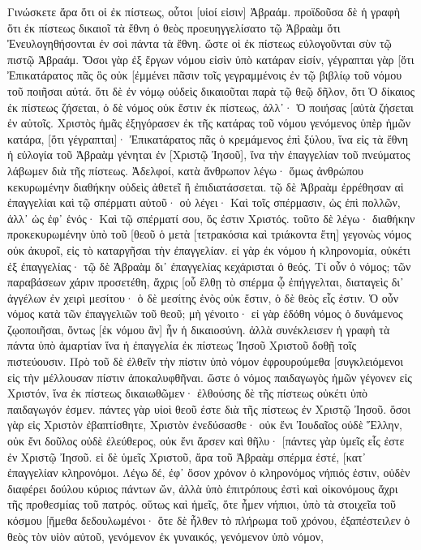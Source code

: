 Γινώσκετε ἄρα ὅτι οἱ ἐκ πίστεως, οὗτοι [υἱοί εἰσιν] Ἀβραάμ. 
προϊδοῦσα δὲ ἡ γραφὴ ὅτι ἐκ πίστεως δικαιοῖ τὰ ἔθνη ὁ θεὸς προευηγγελίσατο τῷ Ἀβραὰμ ὅτι Ἐνευλογηθήσονται ἐν σοὶ πάντα τὰ ἔθνη. 
ὥστε οἱ ἐκ πίστεως εὐλογοῦνται σὺν τῷ πιστῷ Ἀβραάμ. 
Ὅσοι γὰρ ἐξ ἔργων νόμου εἰσὶν ὑπὸ κατάραν εἰσίν, γέγραπται γὰρ [ὅτι Ἐπικατάρατος πᾶς ὃς οὐκ [ἐμμένει πᾶσιν τοῖς γεγραμμένοις ἐν τῷ βιβλίῳ τοῦ νόμου τοῦ ποιῆσαι αὐτά. 
ὅτι δὲ ἐν νόμῳ οὐδεὶς δικαιοῦται παρὰ τῷ θεῷ δῆλον, ὅτι Ὁ δίκαιος ἐκ πίστεως ζήσεται, 
ὁ δὲ νόμος οὐκ ἔστιν ἐκ πίστεως, ἀλλ᾽· Ὁ ποιήσας [αὐτὰ ζήσεται ἐν αὐτοῖς. 
Χριστὸς ἡμᾶς ἐξηγόρασεν ἐκ τῆς κατάρας τοῦ νόμου γενόμενος ὑπὲρ ἡμῶν κατάρα, [ὅτι γέγραπται]· Ἐπικατάρατος πᾶς ὁ κρεμάμενος ἐπὶ ξύλου, 
ἵνα εἰς τὰ ἔθνη ἡ εὐλογία τοῦ Ἀβραὰμ γένηται ἐν [Χριστῷ Ἰησοῦ], ἵνα τὴν ἐπαγγελίαν τοῦ πνεύματος λάβωμεν διὰ τῆς πίστεως. 
Ἀδελφοί, κατὰ ἄνθρωπον λέγω· ὅμως ἀνθρώπου κεκυρωμένην διαθήκην οὐδεὶς ἀθετεῖ ἢ ἐπιδιατάσσεται. 
τῷ δὲ Ἀβραὰμ ἐρρέθησαν αἱ ἐπαγγελίαι καὶ τῷ σπέρματι αὐτοῦ· οὐ λέγει· Καὶ τοῖς σπέρμασιν, ὡς ἐπὶ πολλῶν, ἀλλ᾽ ὡς ἐφ᾽ ἑνός· Καὶ τῷ σπέρματί σου, ὅς ἐστιν Χριστός. 
τοῦτο δὲ λέγω· διαθήκην προκεκυρωμένην ὑπὸ τοῦ [θεοῦ ὁ μετὰ [τετρακόσια καὶ τριάκοντα ἔτη] γεγονὼς νόμος οὐκ ἀκυροῖ, εἰς τὸ καταργῆσαι τὴν ἐπαγγελίαν. 
εἰ γὰρ ἐκ νόμου ἡ κληρονομία, οὐκέτι ἐξ ἐπαγγελίας· τῷ δὲ Ἀβραὰμ δι᾽ ἐπαγγελίας κεχάρισται ὁ θεός. 
Τί οὖν ὁ νόμος; τῶν παραβάσεων χάριν προσετέθη, ἄχρις [οὗ ἔλθῃ τὸ σπέρμα ᾧ ἐπήγγελται, διαταγεὶς δι᾽ ἀγγέλων ἐν χειρὶ μεσίτου· 
ὁ δὲ μεσίτης ἑνὸς οὐκ ἔστιν, ὁ δὲ θεὸς εἷς ἐστιν. 
Ὁ οὖν νόμος κατὰ τῶν ἐπαγγελιῶν τοῦ θεοῦ; μὴ γένοιτο· εἰ γὰρ ἐδόθη νόμος ὁ δυνάμενος ζῳοποιῆσαι, ὄντως [ἐκ νόμου ἂν] ἦν ἡ δικαιοσύνη. 
ἀλλὰ συνέκλεισεν ἡ γραφὴ τὰ πάντα ὑπὸ ἁμαρτίαν ἵνα ἡ ἐπαγγελία ἐκ πίστεως Ἰησοῦ Χριστοῦ δοθῇ τοῖς πιστεύουσιν. 
Πρὸ τοῦ δὲ ἐλθεῖν τὴν πίστιν ὑπὸ νόμον ἐφρουρούμεθα [συγκλειόμενοι εἰς τὴν μέλλουσαν πίστιν ἀποκαλυφθῆναι. 
ὥστε ὁ νόμος παιδαγωγὸς ἡμῶν γέγονεν εἰς Χριστόν, ἵνα ἐκ πίστεως δικαιωθῶμεν· 
ἐλθούσης δὲ τῆς πίστεως οὐκέτι ὑπὸ παιδαγωγόν ἐσμεν. 
πάντες γὰρ υἱοὶ θεοῦ ἐστε διὰ τῆς πίστεως ἐν Χριστῷ Ἰησοῦ. 
ὅσοι γὰρ εἰς Χριστὸν ἐβαπτίσθητε, Χριστὸν ἐνεδύσασθε· 
οὐκ ἔνι Ἰουδαῖος οὐδὲ Ἕλλην, οὐκ ἔνι δοῦλος οὐδὲ ἐλεύθερος, οὐκ ἔνι ἄρσεν καὶ θῆλυ· [πάντες γὰρ ὑμεῖς εἷς ἐστε ἐν Χριστῷ Ἰησοῦ. 
εἰ δὲ ὑμεῖς Χριστοῦ, ἄρα τοῦ Ἀβραὰμ σπέρμα ἐστέ, [κατ᾽ ἐπαγγελίαν κληρονόμοι. 
Λέγω δέ, ἐφ᾽ ὅσον χρόνον ὁ κληρονόμος νήπιός ἐστιν, οὐδὲν διαφέρει δούλου κύριος πάντων ὤν, 
ἀλλὰ ὑπὸ ἐπιτρόπους ἐστὶ καὶ οἰκονόμους ἄχρι τῆς προθεσμίας τοῦ πατρός. 
οὕτως καὶ ἡμεῖς, ὅτε ἦμεν νήπιοι, ὑπὸ τὰ στοιχεῖα τοῦ κόσμου [ἤμεθα δεδουλωμένοι· 
ὅτε δὲ ἦλθεν τὸ πλήρωμα τοῦ χρόνου, ἐξαπέστειλεν ὁ θεὸς τὸν υἱὸν αὐτοῦ, γενόμενον ἐκ γυναικός, γενόμενον ὑπὸ νόμον, 
